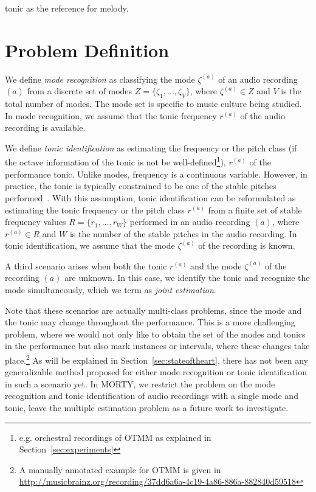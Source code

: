 \documentclass{sig-alternate}
\begin{document}
tonic as the reference for melody.

\section{Problem Definition}\label{sec:problem}
We define \emph{mode recognition} as classifying the mode $\zeta^{(a)}$ of an audio recording $(a)$ from a discrete set of modes $Z = \{\zeta_1, \dots, \zeta_V\}$, where $\zeta^{(a)} \in Z$ and $V$ is the total number of modes. The mode set is specific to music culture being studied. In mode recognition, we assume that the tonic frequency $r^{(a)}$ of the audio recording is available.

We define \emph{tonic identification} as estimating the frequency or the pitch class (if the octave information of the tonic is not be well-defined\footnote{e.g. orchestral recordings of OTMM as explained in Section~\ref{sec:experiments}}), $r^{(a)}$ of the performance tonic. Unlike modes, frequency is a continuous variable. However, in practice, the tonic is typically constrained to be one of the stable pitches performed~\cite{chordia,bozkurt_makam}. With this assumption, tonic identification can be reformulated as estimating the tonic frequency or the pitch class $r^{(a)}$ from a finite set of stable frequency values $R = \{r_1, \dots, r_W\}$ performed in an audio recording $(a)$, where $r^{(a)} \in R$ and $W$ is the number of the stable pitches in the audio recording. In tonic identification, we assume that the mode $\zeta^{(a)}$ of the recording is known. 

A third scenario arises when both the tonic $r^{(a)}$ and the mode $\zeta^{(a)}$ of the recording $(a)$ are unknown. In this case, we identify the tonic and recognize the mode simultaneously, which we term as \emph{joint estimation}.

Note that these scenarios are actually multi-class problems, since the mode and the tonic may change throughout the performance. This is a more challenging problem, where we would not only like to obtain the set of the modes and tonics in the performance but also mark instances or intervals, where these changes take place.\footnote{A manually annotated example for OTMM is given in \url{http://musicbrainz.org/recording/37dd6a6a-4c19-4a86-886a-882840d59518}} As will be explained in Section~\ref{sec:stateoftheart}, there has not been any generalizable method proposed for either mode recognition or tonic identification in such a scenario yet. In MORTY, we restrict the problem on the mode recognition and tonic identification of audio recordings with a single mode and tonic, leave the multiple estimation problem as a future work to investigate.
\end{document}
